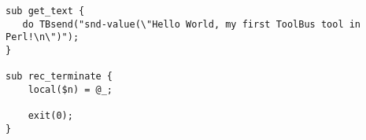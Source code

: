 \begin{verbatim}
sub get_text {
   do TBsend("snd-value(\"Hello World, my first ToolBus tool in Perl!\n\")");
}

sub rec_terminate {
    local($n) = @_;

    exit(0);
}
\end{verbatim}
